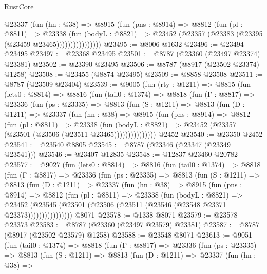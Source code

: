 \begin{lexlean}{RustCore}
\begin{coremodule}
                  @23337
                    (fun (hn : @38) =>
                    @8915
                      (fun (pns : @8914) =>
                      @8812
                        (fun (pl : @8811) =>
                        @23338
                          (fun (bodyL : @8821) =>
                          @23452 (@23357 (@23383 (@23395 (@23459 @23465))))))))))))))))
@23495 := @8006 @1632
@23496 := @23494 @23495
@23497 := @23368 @23495
@23501 := @8787 (@23360 (@23497 @23374) @23381)
@23502 := @23390 @23495
@23506 := @8787 (@8917 (@23502 @23374) @1258)
@23508 := @23455 (@8874 @23495)
@23509 := @8858 @23508
@23511 := @8787 (@23509 @23404)
@23539 := @9005
    (fun (rty : @1211) =>
    @8815
      (fun (lets0 : @8814) =>
      @8816
        (fun (tail0 : @1374) =>
        @8818
          (fun (Γ : @8817) =>
          @23336
            (fun (ps : @23335) =>
            @8813
              (fun (S : @1211) =>
              @8813
                (fun (D : @1211) =>
                @23337
                  (fun (hn : @38) =>
                  @8915
                    (fun (pns : @8914) =>
                    @8812
                      (fun (pl : @8811) =>
                      @23338
                        (fun (bodyL : @8821) =>
                        @23452 (@23357 (@23501 (@23506 (@23511 @23465)))))))))))))))
    @2452
@23540 := @23350 @2452
@23541 := @23540 @8805
@23545 := @8787 (@23346 (@23347 (@23349 @23541)))
@23546 := @23407 @12835
@23548 := @12837 @23460 @20782
@23577 := @9027
    (fun (lets0 : @8814) =>
    @8816
      (fun (tail0 : @1374) =>
      @8818
        (fun (Γ : @8817) =>
        @23336
          (fun (ps : @23335) =>
          @8813
            (fun (S : @1211) =>
            @8813
              (fun (D : @1211) =>
              @23337
                (fun (hn : @38) =>
                @8915
                  (fun (pns : @8914) =>
                  @8812
                    (fun (pl : @8811) =>
                    @23338
                      (fun (bodyL : @8821) =>
                      @23452
                        (@23545
                          (@23501 (@23506 (@23511 (@23546 (@23548 @23371 @23373))))))))))))))))
    @8071
@23578 := @1338 @8071
@23579 := @23578 @23373
@23583 := @8787 (@23360 (@23497 @23579) @23381)
@23587 := @8787 (@8917 (@23502 @23579) @1258)
@23588 := @23548 @8071
@23613 := @9051
    (fun (tail0 : @1374) =>
    @8818
      (fun (Γ : @8817) =>
      @23336
        (fun (ps : @23335) =>
        @8813
          (fun (S : @1211) =>
          @8813
            (fun (D : @1211) =>
            @23337
              (fun (hn : @38) =>

\end{coremodule}
\end{lexlean}
